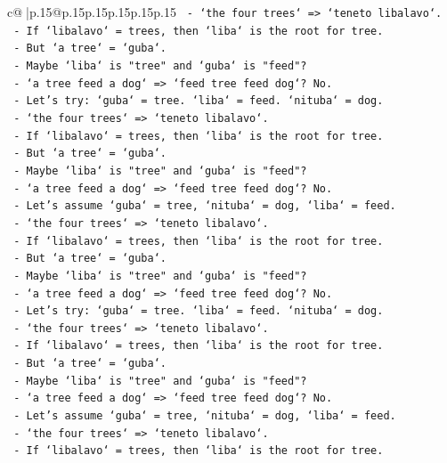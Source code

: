 \documentclass{article}
\begin{document}
{\begin{supertabular}{c@{$\;$}|p{.15\linewidth}@{}p{.15\linewidth}p{.15\linewidth}p{.15\linewidth}p{.15\linewidth}p{.15\linewidth}}
{{{\texttt{  {-} `the four trees` => `teneto libalavo`.} \\
\texttt{  {-} If `libalavo` = trees, then `liba` is the root for tree.} \\
\texttt{  {-} But `a tree` = `guba`.} \\
\texttt{  {-} Maybe `liba` is "tree" and `guba` is "feed"?} \\
\texttt{  {-} `a tree feed a dog` => `feed tree feed dog`? No.} \\
\texttt{  {-} Let's try: `guba` = tree. `liba` = feed. `nituba` = dog.} \\
\texttt{  {-} `the four trees` => `teneto libalavo`.} \\
\texttt{  {-} If `libalavo` = trees, then `liba` is the root for tree.} \\
\texttt{  {-} But `a tree` = `guba`.} \\
\texttt{  {-} Maybe `liba` is "tree" and `guba` is "feed"?} \\
\texttt{  {-} `a tree feed a dog` => `feed tree feed dog`? No.} \\
\texttt{  {-} Let's assume `guba` = tree, `nituba` = dog, `liba` = feed.} \\
\texttt{  {-} `the four trees` => `teneto libalavo`.} \\
\texttt{  {-} If `libalavo` = trees, then `liba` is the root for tree.} \\
\texttt{  {-} But `a tree` = `guba`.} \\
\texttt{  {-} Maybe `liba` is "tree" and `guba` is "feed"?} \\
\texttt{  {-} `a tree feed a dog` => `feed tree feed dog`? No.} \\
\texttt{  {-} Let's try: `guba` = tree. `liba` = feed. `nituba` = dog.} \\
\texttt{  {-} `the four trees` => `teneto libalavo`.} \\
\texttt{  {-} If `libalavo` = trees, then `liba` is the root for tree.} \\
\texttt{  {-} But `a tree` = `guba`.} \\
\texttt{  {-} Maybe `liba` is "tree" and `guba` is "feed"?} \\
\texttt{  {-} `a tree feed a dog` => `feed tree feed dog`? No.} \\
\texttt{  {-} Let's assume `guba` = tree, `nituba` = dog, `liba` = feed.} \\
\texttt{  {-} `the four trees` => `teneto libalavo`.} \\
\texttt{  {-} If `libalavo` = trees, then `liba` is the root for tree.} \\
}}}
\end{supertabular}}
\end{document}
